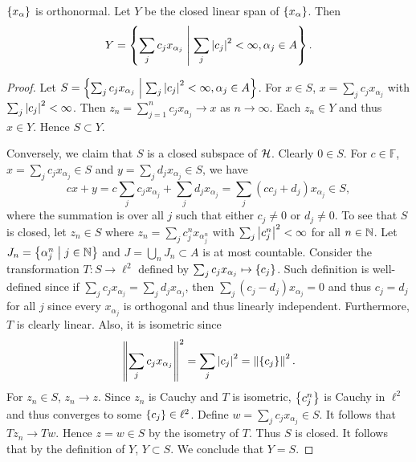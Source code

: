 \begin{proposition}
    $\left\{ {x_\alpha} \right\}$ is orthonormal. Let $Y$ be the closed linear span of 
    $\left\{ {x_\alpha} \right\}$. Then 
    \begin{equation*}
        Y = \left\{ \sum_j c_jx_{\alpha_j} \;\middle\vert\; \sum_j \left\lvert {c_j} \right\rvert^2 < \infty, \alpha_j\in A \right\}.
    \end{equation*}
\end{proposition}
\begin{proof}
    Let $S = \left\{ \sum_j c_jx_{\alpha_j} \;\middle\vert\; \sum_j \left\lvert {c_j} \right\rvert^2 < \infty, \alpha_j\in A \right\}$. 
    For $x\in S$, $x = \sum_j c_jx_{\alpha_j}$ with $\sum_j \left\lvert {c_j} \right\rvert^2 < \infty$. 
    Then $z_n = \sum_{j=1}^{n} c_jx_{\alpha_j}\to x$ as $n\to\infty$. 
    Each $z_n\in Y$ and thus $x\in Y$. Hence $S\subset Y$. 

    Conversely, we claim that $S$ is a closed subspace of $\mathcal{H}$. 
    Clearly $0\in S$. For $c\in\mathbb{F}$, $x = \sum_j c_jx_{\alpha_j}\in S$ 
    and $y = \sum_j d_jx_{\alpha_j}\in S$, we have 
    \begin{equation*}
        cx + y = c\sum_j c_jx_{\alpha_j} + \sum_j d_jx_{\alpha_j} = \sum_j (cc_j + d_j)x_{\alpha_j}\in S,
    \end{equation*}
    where the summation is over all $j$ such that either $c_j\neq 0$ or $d_j\neq 0$.
    To see that $S$ is closed, let $z_n\in S$ where $z_n = \sum_j c_j^nx_{\alpha_j^n}$ 
    with $\sum_j \left\lvert {c_j^n} \right\rvert^2 < \infty$ for all $n\in\mathbb{N}$. Let 
    $J_n = \left\{ \alpha_j^n \;\middle\vert\; j\in\mathbb{N} \right\}$ and $J = \bigcup_n J_n\subset A$ 
    is at most countable. Consider the transformation $T:S\to\ell^2$ 
    defined by $\sum_j c_jx_{\alpha_j}\mapsto \left\{ {c_j} \right\}$. Such 
    definition is well-defined since if $\sum_j c_jx_{\alpha_j} = \sum_j d_jx_{\alpha_j}$, 
    then $\sum_j (c_j - d_j)x_{\alpha_j} = 0$ and thus $c_j = d_j$ for all $j$ since 
    every $x_{\alpha_j}$ is orthogonal and thus linearly independent. 
    Furthermore, $T$ is clearly linear. Also, it is isometric 
    since 
    \begin{equation*}
        \left\lVert {\sum_j c_jx_{\alpha_j}} \right\rVert^2 = \sum_j \left\lvert {c_j} \right\rvert^2 = \left\lVert {\left\{ {c_j} \right\}} \right\rVert^2.
    \end{equation*}
    For $z_n\in S$, $z_n\to z$. Since $z_n$ is Cauchy and $T$ is 
    isometric, $\left\{ {c_j^n} \right\}$ is Cauchy in $\ell^2$ and thus converges 
    to some $\left\{ {c_j} \right\}\in\ell^2$. Define $w = \sum_j c_jx_{\alpha_j}\in S$. 
    It follows that $Tz_n\to Tw$. Hence $z = w\in S$ by the isometry 
    of $T$. Thus $S$ is closed. It follows that by the definition 
    of $Y$, $Y\subset S$. We conclude that $Y = S$.
\end{proof}

